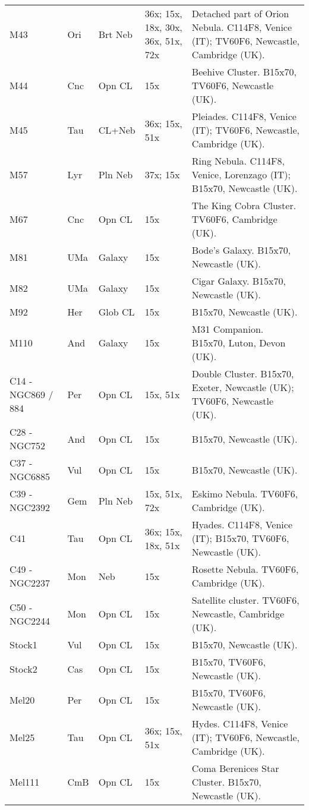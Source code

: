\begin{longtable}{ p{0.7in}  p{0.3in}  p{0.6in}  p{0.9in}  p{5.8in} }
M43 & Ori & Brt Neb & 36x; 15x, 18x, 30x, 36x, 51x, 72x & Detached part of Orion Nebula. C114F8, Venice (IT); TV60F6, Newcastle, Cambridge (UK). \\ 
M44 & Cnc & Opn CL & 15x & Beehive Cluster. B15x70, TV60F6, Newcastle (UK). \\ 
M45 & Tau & CL+Neb & 36x; 15x, 51x & Pleiades. C114F8, Venice (IT); TV60F6, Newcastle, Cambridge (UK). \\ 
M57 & Lyr & Pln Neb & 37x; 15x & Ring Nebula. C114F8, Venice, Lorenzago (IT); B15x70, Newcastle (UK). \\ 
M67 & Cnc & Opn CL & 15x & The King Cobra Cluster. TV60F6, Cambridge (UK). \\ 
M81 & UMa & Galaxy & 15x & Bode's Galaxy. B15x70, Newcastle (UK). \\ 
M82 & UMa & Galaxy & 15x & Cigar Galaxy. B15x70, Newcastle (UK). \\ 
M92 & Her & Glob CL & 15x & B15x70, Newcastle (UK). \\ 
M110 & And & Galaxy & 15x & M31 Companion. B15x70, Luton, Devon (UK). \\ 
C14 - NGC869 / 884 & Per & Opn CL & 15x, 51x & Double Cluster. B15x70, Exeter, Newcastle (UK); TV60F6, Newcastle (UK). \\ 
C28 - NGC752 & And & Opn CL & 15x & B15x70, Newcastle (UK). \\ 
C37 - NGC6885 & Vul & Opn CL & 15x & B15x70, Newcastle (UK). \\ 
C39 - NGC2392 & Gem & Pln Neb & 15x, 51x, 72x & Eskimo Nebula. TV60F6, Cambridge (UK). \\ 
C41 & Tau & Opn CL & 36x; 15x, 18x, 51x & Hyades. C114F8, Venice (IT); B15x70, TV60F6, Newcastle (UK). \\ 
C49 - NGC2237 & Mon & Neb & 15x & Rosette Nebula. TV60F6, Cambridge (UK). \\ 
C50 - NGC2244 & Mon & Opn CL & 15x & Satellite cluster. TV60F6, Newcastle, Cambridge (UK). \\ 
Stock1 & Vul & Opn CL & 15x & B15x70, Newcastle (UK). \\ 
Stock2 & Cas & Opn CL & 15x & B15x70, TV60F6, Newcastle (UK). \\ 
Mel20 & Per & Opn CL & 15x & B15x70, TV60F6, Newcastle (UK). \\ 
Mel25 & Tau & Opn CL & 36x; 15x, 51x & Hydes. C114F8, Venice (IT); TV60F6, Newcastle, Cambridge (UK). \\ 
Mel111 & CmB & Opn CL & 15x & Coma Berenices Star Cluster. B15x70, Newcastle (UK). \\ 

\end{longtable}
